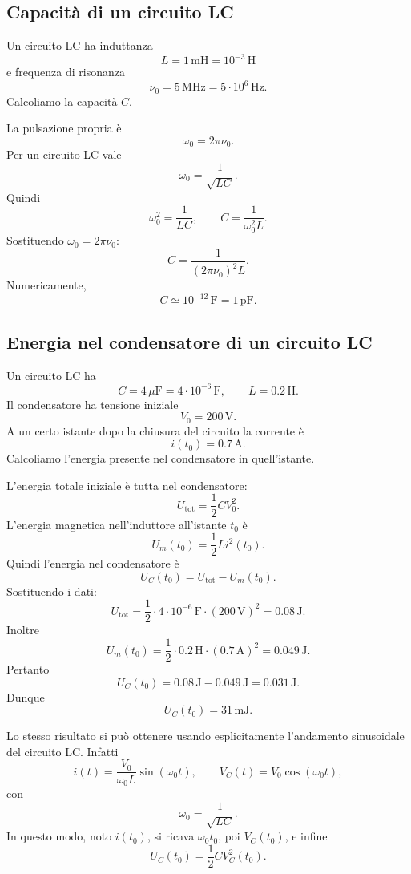\documentclass[a4paper]{article}
\begin{document}
\subsection{Capacità di un circuito LC}

Un circuito LC ha induttanza
\[
L=1\,\mathrm{mH}=10^{-3}\,\mathrm{H}
\]
e frequenza di risonanza
\[
\nu_0=5\,\mathrm{MHz}=5\cdot 10^6\,\mathrm{Hz}.
\]
Calcoliamo la capacità \(C\).

\begin{snippetsolution}{}
La pulsazione propria è
\[
    \omega_0=2\pi\nu_0.
\]
Per un circuito LC vale
\[
    \omega_0=\frac{1}{\sqrt{LC}}.
\]
Quindi
\[
    \omega_0^2=\frac{1}{LC},
    \qquad
    C=\frac{1}{\omega_0^2L}.
\]
Sostituendo \(\omega_0=2\pi\nu_0\):
\[
    C=\frac{1}{(2\pi\nu_0)^2L}.
\]
Numericamente,
\[
    C\simeq 10^{-12}\,\mathrm{F}=1\,\mathrm{pF}.
\]
\end{snippetsolution}

\subsection{Energia nel condensatore di un circuito LC}

Un circuito LC ha
\[
C=4\,\mu\mathrm{F}=4\cdot 10^{-6}\,\mathrm{F},
\qquad
L=0.2\,\mathrm{H}.
\]
Il condensatore ha tensione iniziale
\[
V_0=200\,\mathrm{V}.
\]
A un certo istante dopo la chiusura del circuito la corrente è
\[
i(t_0)=0.7\,\mathrm{A}.
\]
Calcoliamo l'energia presente nel condensatore in quell'istante.

\begin{snippetsolution}{}
L'energia totale iniziale è tutta nel condensatore:
\[
    U_{\mathrm{tot}}=\frac{1}{2}CV_0^2.
\]
L'energia magnetica nell'induttore all'istante \(t_0\) è
\[
    U_m(t_0)=\frac{1}{2}Li^2(t_0).
\]
Quindi l'energia nel condensatore è
\[
    U_C(t_0)=U_{\mathrm{tot}}-U_m(t_0).
\]
Sostituendo i dati:
\[
    U_{\mathrm{tot}}=\frac{1}{2}\cdot 4\cdot 10^{-6}\,\mathrm{F}\cdot(200\,\mathrm{V})^2=0.08\,\mathrm{J}.
\]
Inoltre
\[
    U_m(t_0)=\frac{1}{2}\cdot 0.2\,\mathrm{H}\cdot(0.7\,\mathrm{A})^2=0.049\,\mathrm{J}.
\]
Pertanto
\[
    U_C(t_0)=0.08\,\mathrm{J}-0.049\,\mathrm{J}=0.031\,\mathrm{J}.
\]
Dunque
\[
    U_C(t_0)=31\,\mathrm{mJ}.
\]
\end{snippetsolution}

Lo stesso risultato si può ottenere usando esplicitamente l'andamento sinusoidale del circuito LC. Infatti
\[
i(t)=\frac{V_0}{\omega_0L}\sin(\omega_0t),
\qquad
V_C(t)=V_0\cos(\omega_0t),
\]
con
\[
\omega_0=\frac{1}{\sqrt{LC}}.
\]
In questo modo, noto \(i(t_0)\), si ricava \(\omega_0t_0\), poi \(V_C(t_0)\), e infine
\[
U_C(t_0)=\frac{1}{2}CV_C^2(t_0).
\]
\end{document}
